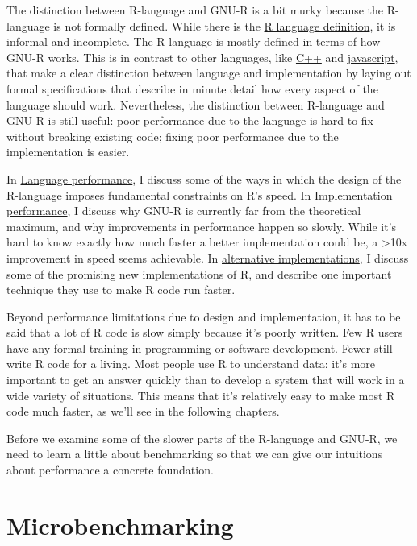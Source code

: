 The distinction between R-language and GNU-R is a bit murky because the
R-language is not formally defined. While there is the
\href{http://cran.r-project.org/doc/manuals/R-lang.html}{R language
definition}, it is informal and incomplete. The R-language is mostly
defined in terms of how GNU-R works. This is in contrast to other
languages, like \href{http://isocpp.org/std/the-standard}{C++} and
\href{http://www.ecma-international.org/publications/standards/Ecma-262.htm}{javascript},
that make a clear distinction between language and implementation by
laying out formal specifications that describe in minute detail how
every aspect of the language should work. Nevertheless, the distinction
between R-language and GNU-R is still useful: poor performance due to
the language is hard to fix without breaking existing code; fixing poor
performance due to the implementation is easier.

In \hyperref[language-performance]{Language performance}, I discuss some
of the ways in which the design of the R-language imposes fundamental
constraints on R's speed. In
\hyperref[implementation-performance]{Implementation performance}, I
discuss why GNU-R is currently far from the theoretical maximum, and why
improvements in performance happen so slowly. While it's hard to know
exactly how much faster a better implementation could be, a
\textgreater{}10x improvement in speed seems achievable. In
\hyperref[faster-r]{alternative implementations}, I discuss some of the
promising new implementations of R, and describe one important technique
they use to make R code run faster.

Beyond performance limitations due to design and implementation, it has
to be said that a lot of R code is slow simply because it's poorly
written. Few R users have any formal training in programming or software
development. Fewer still write R code for a living. Most people use R to
understand data: it's more important to get an answer quickly than to
develop a system that will work in a wide variety of situations. This
means that it's relatively easy to make most R code much faster, as
we'll see in the following chapters.

Before we examine some of the slower parts of the R-language and GNU-R,
we need to learn a little about benchmarking so that we can give our
intuitions about performance a concrete foundation.

\section{Microbenchmarking}\label{microbenchmarking}

